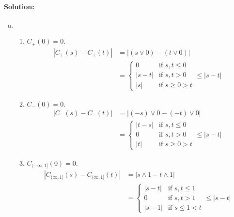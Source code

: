\paragraph{Solution:}
\begin{enumerate}[(a)]
	\item
		\begin{enumerate}
			\item 
				$C_{+}(0) = 0$.\\
				\begin{equation*}
					\begin{aligned}
						\left|C_{+}(s) - C_{+}(t)\right| &= \left|(s\vee 0) - (t\vee 0)\right|\\
						&=
						\begin{cases}
							0 &\text{if }s,t\leq 0\\
							|s - t| &\text{if }s,t>0\\
							|s| &\text{if }s\geq 0>t
						\end{cases} \leq |s - t|
					\end{aligned}
				\end{equation*}
			\item 
				$C_{-}(0) = 0$.\\
				\begin{equation*}
					\begin{aligned}
						|C_{-}(s) - C_{-}(t)| &= |(-s)\vee 0 - (-t)\vee 0|\\
						&=
						\begin{cases}
							|t - s| &\text{if }s,t\leq 0\\
							0 &\text{if }s,t>0\\
							|t| &\text{if }s\geq 0>t
						\end{cases} \leq |s - t|
					\end{aligned}
				\end{equation*}
			\item 
				$C_{(-\infty,1]}(0) = 0$.\\
				\begin{equation*}
					\begin{aligned}
						|C_{(\infty,1]}(s) - C_{(\infty,1]}(t)| &= |s\wedge 1 - t\wedge 1|\\
						&=
						\begin{cases}
							|s - t| &\text{if }s,t\leq 1\\
							0 &\text{if }s,t>1\\
							|s - 1| &\text{if }s\leq 1<t
						\end{cases} \leq |s - t|
					\end{aligned}

\end{equation*}
\end{enumerate}
\end{enumerate}
